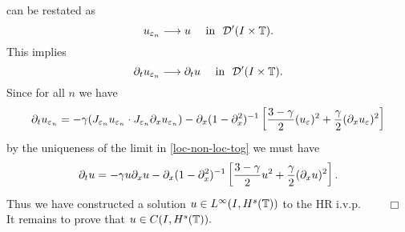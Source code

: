 		can be restated as 
		\begin{equation}
			u_{\varepsilon_n}  \longrightarrow  u
			\quad
			\text{ in }  \,\,
			\mathcal{D}'(I\times \mathbb{T}).
		\end{equation}
		This implies 
		\begin{equation}
			\label{distib-conv-2}
			\partial_tu_{\varepsilon_n}  \longrightarrow  \partial_tu
			\quad
			\text{ in }  \,\, \mathcal{D}'(I\times \mathbb{T}).
		\end{equation}
		Since for all $n$ we have 
		\begin{equation}
			\partial_tu_{\varepsilon_n} 
			=
			-\gamma (J_{\varepsilon_n} u_{\varepsilon_n}  \cdot
			J_{\varepsilon_n}\partial_x u_{\varepsilon_n}) - \partial_x (1-
			\partial_x^2)^{-1} \left
			[\frac{3-\gamma}{2}(u_\varepsilon)^2 + \frac{\gamma}{2}(\partial_x u_\varepsilon)^2 \right ] 
		\end{equation}
		by the uniqueness  of the limit in \eqref{loc-non-loc-tog}
		we must have
		\begin{equation}
			\label{1000y}
			\partial_t u =- \gamma u \partial_x u- \partial_x (1- \partial_x^2)^{-1} \left
			[\frac{3-\gamma}{2}u^2 + \frac{\gamma}{2}(\partial_x u)^2 \right ].
		\end{equation}
		Thus we have constructed a solution $u \in L^\infty(I, H^s(\mathbb{T}))$
		to the HR i.v.p. $\qquad \Box$
		It remains to prove that $u \in C(I, H^s(\mathbb{T})).$
%
%
%
%
%
